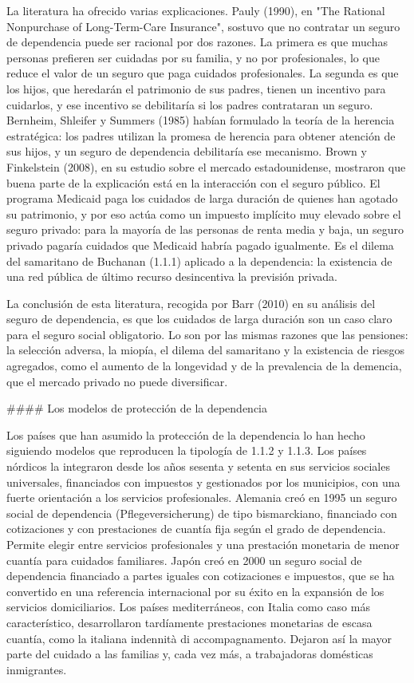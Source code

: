\documentclass[10pt,a4paper]{article}
\begin{document}
La literatura ha ofrecido varias explicaciones. Pauly (1990), en "The Rational Nonpurchase of Long-Term-Care Insurance", sostuvo que no contratar un seguro de dependencia puede ser racional por dos razones. La primera es que muchas personas prefieren ser cuidadas por su familia, y no por profesionales, lo que reduce el valor de un seguro que paga cuidados profesionales. La segunda es que los hijos, que heredarán el patrimonio de sus padres, tienen un incentivo para cuidarlos, y ese incentivo se debilitaría si los padres contrataran un seguro. Bernheim, Shleifer y Summers (1985) habían formulado la teoría de la herencia estratégica: los padres utilizan la promesa de herencia para obtener atención de sus hijos, y un seguro de dependencia debilitaría ese mecanismo. Brown y Finkelstein (2008), en su estudio sobre el mercado estadounidense, mostraron que buena parte de la explicación está en la interacción con el seguro público. El programa Medicaid paga los cuidados de larga duración de quienes han agotado su patrimonio, y por eso actúa como un impuesto implícito muy elevado sobre el seguro privado: para la mayoría de las personas de renta media y baja, un seguro privado pagaría cuidados que Medicaid habría pagado igualmente. Es el dilema del samaritano de Buchanan (1.1.1) aplicado a la dependencia: la existencia de una red pública de último recurso desincentiva la previsión privada.

La conclusión de esta literatura, recogida por Barr (2010) en su análisis del seguro de dependencia, es que los cuidados de larga duración son un caso claro para el seguro social obligatorio. Lo son por las mismas razones que las pensiones: la selección adversa, la miopía, el dilema del samaritano y la existencia de riesgos agregados, como el aumento de la longevidad y de la prevalencia de la demencia, que el mercado privado no puede diversificar.

#### Los modelos de protección de la dependencia

Los países que han asumido la protección de la dependencia lo han hecho siguiendo modelos que reproducen la tipología de 1.1.2 y 1.1.3. Los países nórdicos la integraron desde los años sesenta y setenta en sus servicios sociales universales, financiados con impuestos y gestionados por los municipios, con una fuerte orientación a los servicios profesionales. Alemania creó en 1995 un seguro social de dependencia (Pflegeversicherung) de tipo bismarckiano, financiado con cotizaciones y con prestaciones de cuantía fija según el grado de dependencia. Permite elegir entre servicios profesionales y una prestación monetaria de menor cuantía para cuidados familiares. Japón creó en 2000 un seguro social de dependencia financiado a partes iguales con cotizaciones e impuestos, que se ha convertido en una referencia internacional por su éxito en la expansión de los servicios domiciliarios. Los países mediterráneos, con Italia como caso más característico, desarrollaron tardíamente prestaciones monetarias de escasa cuantía, como la italiana indennità di accompagnamento. Dejaron así la mayor parte del cuidado a las familias y, cada vez más, a trabajadoras domésticas inmigrantes.
\end{document}
